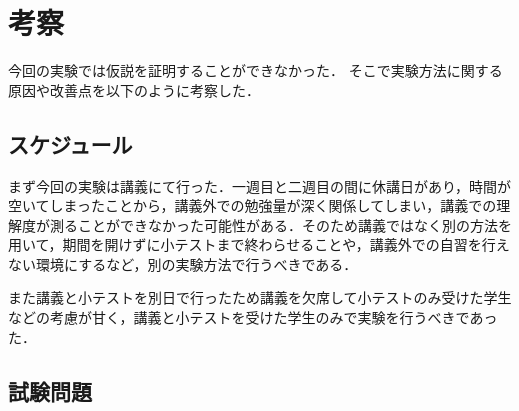 \documentclass[a4j,12pt]{jsarticle}
\begin{document}
\vspace{1zh}
\begin{table}[H]
\centering
\caption{小テストの偏差値と平均点}
\label{fig:allank}
\end{table}

 


\newpage
\section{考察}
今回の実験では仮説を証明することができなかった．
そこで実験方法に関する原因や改善点を以下のように考察した．

\subsection{スケジュール}
まず今回の実験は講義にて行った．一週目と二週目の間に休講日があり，時間が空いてしまったことから，講義外での勉強量が深く関係してしまい，講義での理解度が測ることができなかった可能性がある．そのため講義ではなく別の方法を用いて，期間を開けずに小テストまで終わらせることや，講義外での自習を行えない環境にするなど，別の実験方法で行うべきである．

また講義と小テストを別日で行ったため講義を欠席して小テストのみ受けた学生などの考慮が甘く，講義と小テストを受けた学生のみで実験を行うべきであった．





\subsection{試験問題}
\end{document}
